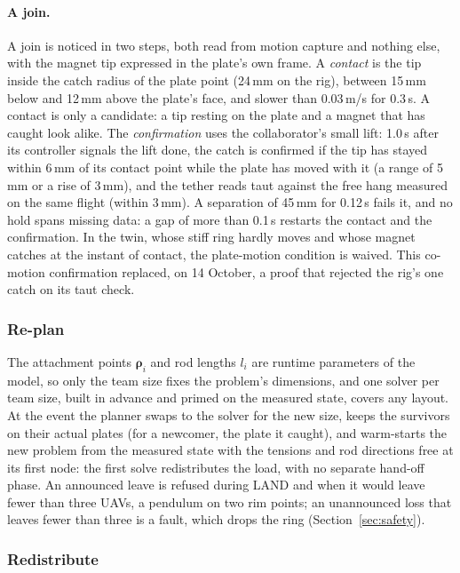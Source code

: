 \paragraph{A join.} A join is noticed in two steps, both read from motion capture and nothing else, with the
magnet tip expressed in the plate's own frame. A \emph{contact} is the tip inside the catch radius of the plate
point (24\,mm on the rig), between 15\,mm below and 12\,mm above the plate's face, and slower than 0.03\,m/s for
0.3\,s. A contact is only a candidate: a tip resting on the plate and a magnet that has caught look alike. The
\emph{confirmation} uses the collaborator's small lift: 1.0\,s after its controller signals the lift done, the catch
is confirmed if the tip has stayed within 6\,mm of its contact point while the plate has moved with it (a range of
5\,mm or a rise of 3\,mm), and the tether reads taut against the free hang measured on the same flight (within
3\,mm). A separation of 45\,mm for 0.12\,s fails it, and no hold spans missing data: a gap of more than 0.1\,s
restarts the contact and the confirmation. In the twin, whose stiff ring hardly moves and whose magnet catches at the
instant of contact, the plate-motion condition is waived. This co-motion confirmation replaced, on 14 October, a proof
that rejected the rig's one catch on its taut check.

\subsubsection{Re-plan}

The attachment points $\boldsymbol{\rho}_i$ and rod lengths $l_i$ are runtime parameters of the model, so only the team
size fixes the problem's dimensions, and one solver per team size, built in advance and primed on the measured state,
covers any layout. At the event the planner swaps to the solver for the new size, keeps the survivors on their actual
plates (for a newcomer, the plate it caught), and warm-starts the new problem from the measured state with the tensions
and rod directions free at its first node: the first solve redistributes the load, with no separate hand-off phase. An
announced leave is refused during LAND and when it would leave fewer than three UAVs, a pendulum on two rim points; an
unannounced loss that leaves fewer than three is a fault, which drops the ring (Section~\ref{sec:safety}).

\subsubsection{Redistribute}

